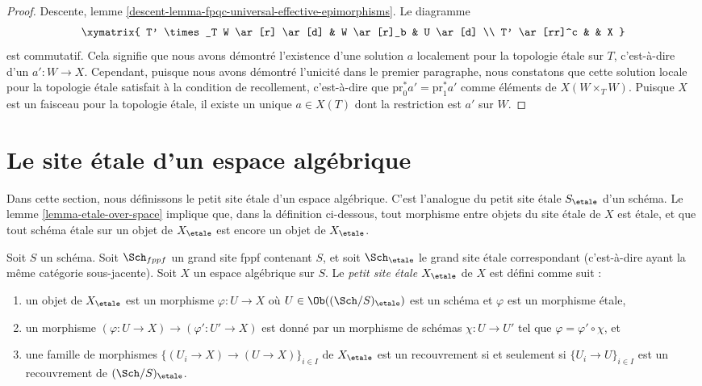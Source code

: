 \begin{proof}
Descente, lemme \ref{descent-lemma-fpqc-universal-effective-epimorphisms}.
Le diagramme
$$
\xymatrix{
T' \times_T W \ar[r] \ar[d] & W \ar[r]_b & U \ar[d] \\
T' \ar[rr]^c &  & X
}
$$
est commutatif. Cela signifie que nous avons démontré l'existence
d'une solution $a$ localement pour la topologie \'etale sur $T$, c'est-à-dire d'un $a' : W \to X$.
Cependant, puisque nous avons démontré l'unicité
dans le premier paragraphe, nous constatons que cette solution locale pour la topologie \'etale
satisfait à la condition de recollement, c'est-à-dire que
$\text{pr}_0^*a' = \text{pr}_1^*a'$ comme éléments de $X(W \times_T W)$.
Puisque $X$ est un faisceau pour la topologie \'etale, il existe un unique $a \in X(T)$ dont la restriction
est $a'$ sur $W$.
\end{proof}









\section{Le site \'etale d'un espace algébrique}
\label{section-etale-site}

\noindent
Dans cette section, nous définissons le petit site \'etale d'un espace algébrique.
C'est l'analogue du petit site \'etale $S_\etale$ d'un schéma.
Le lemme \ref{lemma-etale-over-space} implique que, dans la définition ci-dessous,
tout morphisme entre objets du site \'etale de $X$ est \'etale, et que
tout schéma \'etale sur un objet de $X_\etale$ est encore un objet de
$X_\etale$.

\begin{definition}
\label{definition-etale-site}
Soit $S$ un schéma.
Soit $\Sch_{fppf}$ un grand site fppf contenant $S$,
et soit $\Sch_\etale$ le grand site \'etale correspondant
(c'est-à-dire ayant la même catégorie sous-jacente).
Soit $X$ un espace algébrique sur $S$.
Le {\it petit site \'etale $X_\etale$} de $X$ est défini comme suit :
\begin{enumerate}
\item un objet de $X_\etale$ est un morphisme $\varphi : U \to X$
où $U \in \Ob((\Sch/S)_\etale)$ est un schéma et
$\varphi$ est un morphisme \'etale,
\item un morphisme $(\varphi : U \to X) \to (\varphi' : U' \to X)$
est donné par un morphisme de schémas $\chi : U \to U'$ tel que
$\varphi = \varphi' \circ \chi$, et
\item une famille de morphismes $\{(U_i \to X) \to (U \to X)\}_{i \in I}$
de $X_\etale$ est un recouvrement si et seulement si $\{U_i \to U\}_{i \in I}$
est un recouvrement de $(\Sch/S)_\etale$.
\end{enumerate}
\end{definition}

